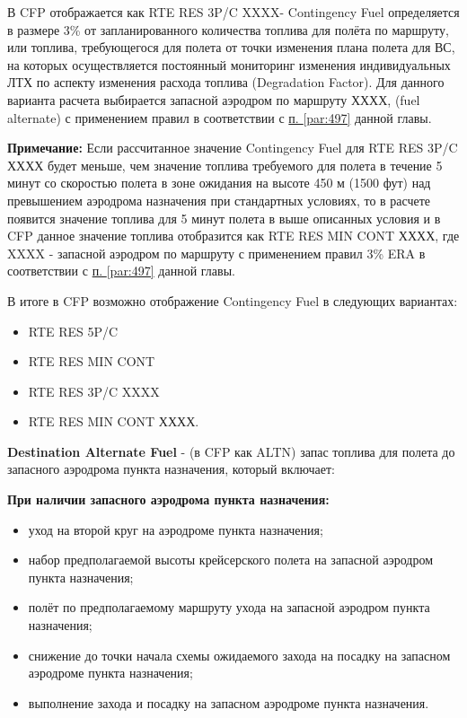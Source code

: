 В CFP отображается как RTE RES 3P/C XXXX- Contingency Fuel определяется в размере 3\% от запланированного количества топлива для полёта по маршруту, или топлива, требующегося для полета от точки изменения плана полета для ВС, на которых осуществляется постоянный мониторинг изменения индивидуальных ЛТХ по аспекту изменения расхода топлива (Degradation Factor). Для данного варианта расчета выбирается запасной аэродром по маршруту ХХХХ, (fuel alternate) с применением правил в соответствии с \hyperref[par:497]{п. \ref*{par:497}} данной главы. 

\textbf{Примечание:} Если рассчитанное значение Contingency Fuel для RTE RES 3P/C ХХХХ будет меньше, чем значение топлива требуемого для полета в течение 5 минут со скоростью полета в зоне ожидания на высоте 450 м (1500 фут) над превышением аэродрома назначения при стандартных условиях, то в расчете появится значение топлива для 5 минут полета в выше описанных условия и в CFP данное значение топлива отобразится как RTE RES MIN CONT ХХХХ, где XXXX - запасной аэродром по маршруту с применением правил 3\% ERA в соответствии с \hyperref[par:497]{п. \ref*{par:497}} данной главы. 

В итоге в CFP возможно отображение Contingency Fuel в следующих вариантах:
\begin{itemize}
    \item RTE RES 5P/C
    \item RTE RES MIN CONT
    \item RTE RES 3P/C XXXX
    \item RTE RES MIN CONT ХХХХ.
\end{itemize} 

\textbf{Destination Alternate Fuel} - (в CFP как ALTN) запас топлива для полета до запасного аэродрома пункта назначения, который включает: 

\textbf{При наличии запасного аэродрома пункта назначения:} 
\begin{itemize}
    \item уход на второй круг на аэродроме пункта назначения;
    \item набор предполагаемой высоты крейсерского полета на запасной аэродром пункта назначения;
    \item полёт по предполагаемому маршруту ухода на запасной аэродром пункта назначения;
    \item снижение до точки начала схемы ожидаемого захода на посадку на запасном аэродроме пункта назначения;
    \item выполнение захода и посадку на запасном аэродроме пункта назначения. 
\end{itemize}
	
